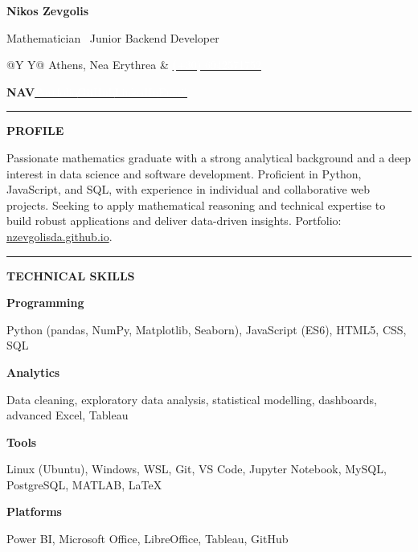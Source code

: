 \documentclass[10pt,a4paper]{article}
\newcommand{\sectiontitle}[1]{%
    \vspace{0.46em}%
    {\color{accent}\rule{0.08\textwidth}{1.4pt}}\hspace{0.55em}%
    {\small\bfseries\color{ink}\MakeUppercase{#1}}\par
    \vspace{0.22em}
}
\newcommand{\cvrow}[2]{%
    {\small\bfseries\color{accent}#1}\par
    {\small\color{ink}#2}\par\vspace{0.1em}
}
\begin{document}
\noindent\colorbox{ink}{%
    \parbox{\dimexpr\textwidth-2\fboxsep\relax}{%
        \vspace{0.15em}
        {\fontsize{27}{30}\selectfont\bfseries\color{white}Nikos Zevgolis}\par
        \vspace{2pt}
        {\large\color{accent}Mathematician \textbar\ Junior Backend Developer}\par
        \vspace{7pt}
        \begin{tabularx}{\linewidth}{@{}Y Y@{}}
            {\footnotesize\color{white}\faMapMarker\hspace{0.35em}Athens, Nea Erythrea} &
            {\footnotesize\color{white}\href{tel:+306942571752}{\textcolor{white}{\faPhone\hspace{0.35em}(+30) 6942571752}}}\\
        \end{tabularx}\par\vspace{3pt}
        \parbox{\linewidth}{\footnotesize\color{white}\textbf{NAV}\hspace{0.8em}\href{https://nzevgolisda.github.io/}{\textcolor{white}{Portfolio}}\hspace{1.1em}\href{https://github.com/nzevgolisda}{\textcolor{white}{GitHub}}\hspace{1.1em}\href{https://www.linkedin.com/in/nikos-zevgolis-2193871b7/}{\textcolor{white}{LinkedIn}}\hspace{1.1em}\href{mailto:nzevgolisda@gmail.com}{\textcolor{white}{Email}}}
        \vspace{0.45em}
    }%
}\par

\sectiontitle{Profile}
Passionate mathematics graduate with a strong analytical background and a deep interest in data science and software development. Proficient in Python, JavaScript, and SQL, with experience in individual and collaborative web projects. Seeking to apply mathematical reasoning and technical expertise to build robust applications and deliver data-driven insights. Portfolio: \href{https://nzevgolisda.github.io/}{nzevgolisda.github.io}.

\sectiontitle{Technical Skills}
\cvrow{Programming}{Python (pandas, NumPy, Matplotlib, Seaborn), JavaScript (ES6), HTML5, CSS, SQL}
\cvrow{Analytics}{Data cleaning, exploratory data analysis, statistical modelling, dashboards, advanced Excel, Tableau}
\cvrow{Tools}{Linux (Ubuntu), Windows, WSL, Git, VS Code, Jupyter Notebook, MySQL, PostgreSQL, MATLAB, \LaTeX}
\cvrow{Platforms}{Power BI, Microsoft Office, LibreOffice, Tableau, GitHub}
\end{document}

